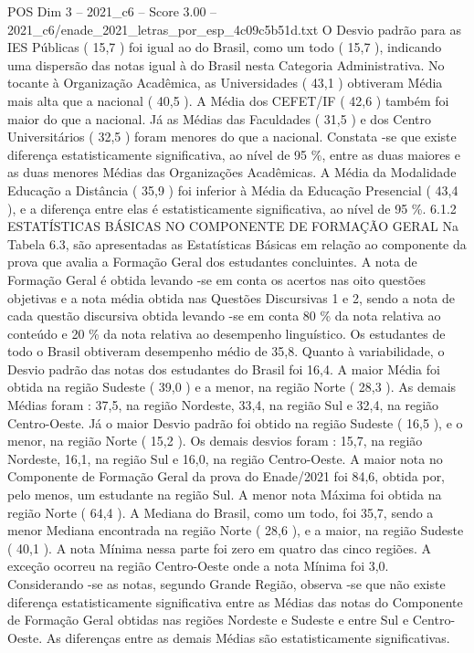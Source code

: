 \begin{textsample}{POS Dim 3 – 2021\_c6 – Score 3.00 – 2021\_c6/enade\_2021\_letras\_por\_esp\_4c09c5b51d.txt}
O Desvio padrão para as IES Públicas ( 15,7 ) foi igual ao do Brasil, como um todo ( 15,7 ), indicando uma dispersão das notas igual à do Brasil nesta Categoria Administrativa.
No tocante à Organização Acadêmica, as Universidades ( 43,1 ) obtiveram Média mais alta que a nacional ( 40,5 ).
A Média dos CEFET/IF ( 42,6 ) também foi maior do que a nacional.
Já as Médias das Faculdades ( 31,5 ) e dos Centro Universitários ( 32,5 ) foram menores do que a nacional.
Constata -se que existe diferença estatisticamente significativa, ao nível de 95 \%, entre as duas maiores e as duas menores Médias das Organizações Acadêmicas.
A Média da Modalidade Educação a Distância ( 35,9 ) foi inferior à Média da Educação Presencial ( 43,4 ), e a diferença entre elas é estatisticamente significativa, ao nível de 95 \%. 6.1.2 ESTATÍSTICAS BÁSICAS NO COMPONENTE DE FORMAÇÃO GERAL Na Tabela 6.3, são apresentadas as Estatísticas Básicas em relação ao componente da prova que avalia a Formação Geral dos estudantes concluintes.
A nota de Formação Geral é obtida levando -se em conta os acertos nas oito questões objetivas e a nota média obtida nas Questões Discursivas 1 e 2, sendo a nota de cada questão discursiva obtida levando -se em conta 80 \% da nota relativa ao conteúdo e 20 \% da nota relativa ao desempenho linguístico.
Os estudantes de todo o Brasil obtiveram desempenho médio de 35,8.
Quanto à variabilidade, o Desvio padrão das notas dos estudantes do Brasil foi 16,4.
A maior Média foi obtida na região Sudeste ( 39,0 ) e a menor, na região Norte ( 28,3 ).
As demais Médias foram : 37,5, na região Nordeste, 33,4, na região Sul e 32,4, na região Centro-Oeste.
Já o maior Desvio padrão foi obtido na região Sudeste ( 16,5 ), e o menor, na região Norte ( 15,2 ).
Os demais desvios foram : 15,7, na região Nordeste, 16,1, na região Sul e 16,0, na região Centro-Oeste.
A maior nota no Componente de Formação Geral da prova do Enade/2021 foi 84,6, obtida por, pelo menos, um estudante na região Sul.
A menor nota Máxima foi obtida na região Norte ( 64,4 ).
A Mediana do Brasil, como um todo, foi 35,7, sendo a menor Mediana encontrada na região Norte ( 28,6 ), e a maior, na região Sudeste ( 40,1 ).
A nota Mínima nessa parte foi zero em quatro das cinco regiões.
A exceção ocorreu na região Centro-Oeste onde a nota Mínima foi 3,0.
Considerando -se as notas, segundo Grande Região, observa -se que não existe diferença estatisticamente significativa entre as Médias das notas do Componente de Formação Geral obtidas nas regiões Nordeste e Sudeste e entre Sul e Centro-Oeste.
As diferenças entre as demais Médias são estatisticamente significativas.

\end{textsample}
